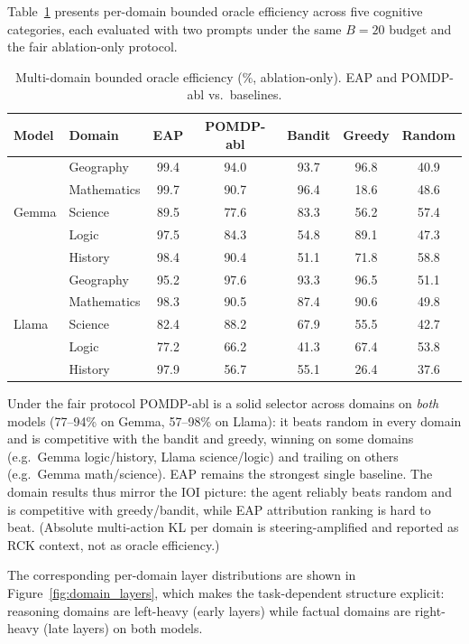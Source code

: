 Table~\ref{tab:domain} presents per-domain bounded oracle efficiency
across five cognitive categories, each evaluated with two prompts
under the same $B=20$ budget and the fair ablation-only protocol.

\begin{table}[H]
\centering
\caption{Multi-domain bounded oracle efficiency (\%, ablation-only).
EAP and POMDP-abl vs.\ baselines.}
\label{tab:domain}
{\small
\begin{tabular}{llccccc}
\toprule
\textbf{Model} & \textbf{Domain} & \textbf{EAP} & \textbf{POMDP-abl} & \textbf{Bandit} & \textbf{Greedy} & \textbf{Random} \\
\midrule
\multirow{5}{*}{Gemma}
 & Geography    & 99.4 & 94.0 & 93.7 & 96.8 & 40.9 \\
 & Mathematics  & 99.7 & 90.7 & 96.4 & 18.6 & 48.6 \\
 & Science      & 89.5 & 77.6 & 83.3 & 56.2 & 57.4 \\
 & Logic        & 97.5 & 84.3 & 54.8 & 89.1 & 47.3 \\
 & History      & 98.4 & 90.4 & 51.1 & 71.8 & 58.8 \\
\midrule
\multirow{5}{*}{Llama}
 & Geography    & 95.2 & 97.6 & 93.3 & 96.5 & 51.1 \\
 & Mathematics  & 98.3 & 90.5 & 87.4 & 90.6 & 49.8 \\
 & Science      & 82.4 & 88.2 & 67.9 & 55.5 & 42.7 \\
 & Logic        & 77.2 & 66.2 & 41.3 & 67.4 & 53.8 \\
 & History      & 97.9 & 56.7 & 55.1 & 26.4 & 37.6 \\
\bottomrule
\end{tabular}%
}
\end{table}

Under the fair protocol POMDP-abl is a solid selector across domains on
\emph{both} models (77--94\% on Gemma, 57--98\% on Llama): it beats
random in every domain and is competitive with the bandit and greedy,
winning on some domains (e.g.\ Gemma logic/history, Llama science/logic)
and trailing on others (e.g.\ Gemma math/science).  EAP remains the
strongest single baseline.  The domain results thus mirror the IOI
picture: the agent reliably beats random and is competitive with
greedy/bandit, while EAP attribution ranking is hard to beat.  (Absolute multi-action KL per domain is
steering-amplified and reported as RCK context, not as oracle
efficiency.)

The corresponding per-domain layer distributions are shown in
Figure~\ref{fig:domain_layers}, which makes the task-dependent
structure explicit: reasoning domains are left-heavy (early layers)
while factual domains are right-heavy (late layers) on both models.

